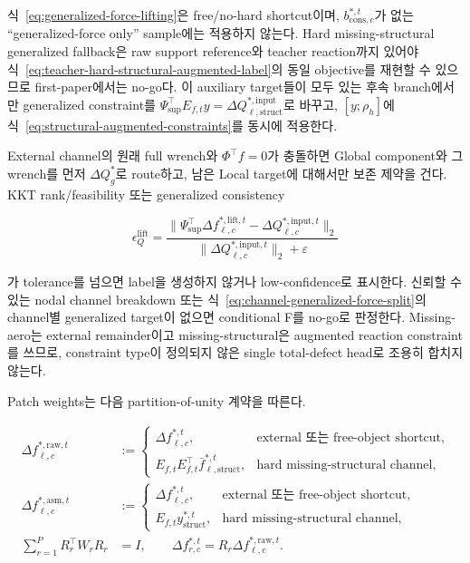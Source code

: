 \documentclass[11pt,a4paper]{article}
\newcommand{\eps}{\varepsilon}
\begin{document}
식~\eqref{eq:generalized-force-lifting}은 free/no-hard shortcut이며,
\(b_{\mathrm{cons},c}^{*,t}\)가 없는 ``generalized-force only'' sample에는 적용하지 않는다.
Hard missing-structural generalized fallback은 raw support reference와 teacher reaction까지 있어야
식~\eqref{eq:teacher-hard-structural-augmented-label}의 동일 objective를 재현할 수 있으므로
first-paper에서는 no-go다. 이 auxiliary target들이 모두 있는 후속 branch에서만 generalized constraint를
\(\Psi_{\mathrm{sup}}^\top E_{f,t}y
=\Delta Q_{\ell,\mathrm{struct}}^{*,\mathrm{input}}\)로 바꾸고,
\([y;\rho_h]\)에 식~\eqref{eq:structural-augmented-constraints}를 동시에 적용한다.

External channel의 원래 full wrench와 \(\Phi^\top f=0\)가 충돌하면
Global component와 그 wrench를 먼저 \(\Delta Q_g^*\)로 route하고,
남은 Local target에 대해서만 보존 제약을 건다.
KKT rank/feasibility 또는 generalized consistency

\begin{equation}
  \epsilon_Q^{\mathrm{lift}}
  =
  \frac{
    \|\Psi_{\mathrm{sup}}^\top\Delta f_{\ell,c}^{*,\mathrm{lift},t}
    -\Delta Q_{\ell,c}^{*,\mathrm{input},t}\|_2
  }{
    \|\Delta Q_{\ell,c}^{*,\mathrm{input},t}\|_2+\eps
  }
\end{equation}

가 tolerance를 넘으면 label을 생성하지 않거나 low-confidence로 표시한다.
신뢰할 수 있는 nodal channel breakdown 또는 식~\eqref{eq:channel-generalized-force-split}의
channel별 generalized target이 없으면 conditional F를 no-go로 판정한다.
Missing-aero는 external remainder이고 missing-structural은 augmented reaction constraint를 쓰므로,
constraint type이 정의되지 않은 single total-defect head로 조용히 합치지 않는다.

Patch weights는 다음 partition-of-unity 계약을 따른다.

\begin{equation}
\begin{aligned}
\Delta f_{\ell,c}^{*,\mathrm{raw},t}
&:=
\begin{cases}
  \Delta f_{\ell,c}^{*,t},
  &\text{external 또는 free-object shortcut},\\
  E_{f,t}E_{f,t}^\top\bar f_{\ell,\mathrm{struct}}^{*,t},
  &\text{hard missing-structural channel},
\end{cases}\\
\Delta f_{\ell,c}^{*,\mathrm{asm},t}
&:=
\begin{cases}
  \Delta f_{\ell,c}^{*,t},
  &\text{external 또는 free-object shortcut},\\
  E_{f,t}y_{\mathrm{struct}}^{*,t},
  &\text{hard missing-structural channel},
\end{cases}\\
\sum_{r=1}^{P}R_r^\top W_rR_r
&=I,
\qquad
\Delta f_{r,c}^{*,t}=R_r\Delta f_{\ell,c}^{*,\mathrm{raw},t}.
\end{aligned}
  \label{eq:patch-force-label}
\end{equation}
\end{document}

